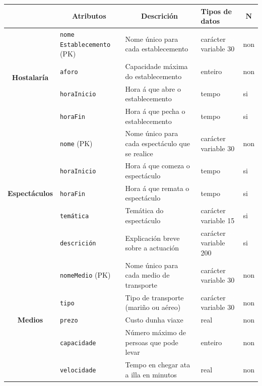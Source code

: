 \documentclass[12pt,a4paper]{book}
\theoremstyle{definition}
\theoremstyle{break}
\begin{document}
	\newpage
	
	
	\begin{table} [H] \centering
		\begin{tabular}{|c|m{3cm}|m{4cm}|m{2cm}|m{0.7cm}|}
			\hline \rowcolor{gris}
			\multicolumn{1}{|m{2.5cm}|}{Entidade ou relación} & \multicolumn{1}{c|}{Atributos} & \multicolumn{1}{c|}{Descrición} & \multicolumn{1}{m{2cm}|}{Tipos de datos} & \multicolumn{1}{c|}{$\mathbf{N}$} \\
			\hline
			\multirow{4}{*}{\textbf{Hostalaría}} & \texttt{nome Establecemento} (PK) & Nome único para cada establecemento &  carácter \textcolor{white}{aa} variable 30 & non \\
			\cline{2-5}
			& \texttt{aforo} & Capacidade máxima do establecemento & enteiro & non \\
			\cline{2-5}
			& \texttt{horaInicio} & Hora á que abre o establecemento & tempo & si \\
			\cline{2-5}
			& \texttt{horaFin} & Hora á que pecha o establecemento & tempo & si \\
			\hline
			\multirow{5}{*}{\textbf{Espectáculos}} & \texttt{nome} (PK) & Nome único para cada espectáculo que se realice &  carácter \textcolor{white}{aa} variable 30 & non \\
			\cline{2-5}
			& \texttt{horaInicio} & Hora á que comeza o espectáculo & tempo & si \\
			\cline{2-5}
			& \texttt{horaFin} & Hora á que remata o espectáculo & tempo & si \\
			\cline{2-5}
			& \texttt{temática} & Temática do espectáculo &  carácter \textcolor{white}{aa} variable 15 & si \\
			\cline{2-5}
			& \texttt{descrición} & Explicación breve sobre a actuación &  carácter \textcolor{white}{aa} variable 200 & si \\
			\hline
			\multirow{5}{*}{\textbf{Medios}} & \texttt{nomeMedio} (PK) & Nome único para cada medio de transporte &  carácter \textcolor{white}{aa} variable 30 & non\\
			\cline{2-5}
			& \texttt{tipo} & Tipo de transporte (mariño ou aéreo) &  carácter \textcolor{white}{aa} variable 30 & non\\
			\cline{2-5}
			&\texttt{prezo} & Custo dunha viaxe & real & non\\
			\cline{2-5}
			&\texttt{capacidade} & Número máximo de persoas que pode levar & enteiro & non\\
			\cline{2-5}
			&\texttt{velocidade} & Tempo en chegar ata a illa en minutos & real & non\\
			\hline
		\end{tabular}
	\end{table}
	
\end{document}
